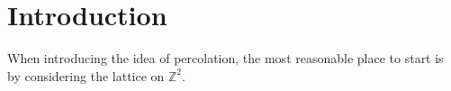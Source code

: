 \section{Introduction}
When introducing the idea of percolation, the most reasonable place to start is by considering the lattice on $\mathbb{Z}^2$.
